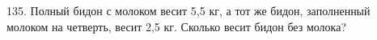 135. Полный бидон с молоком весит 5,5 кг, а тот же бидон, заполненный молоком на четверть, весит 2,5 кг. Сколько весит бидон без молока?\\

